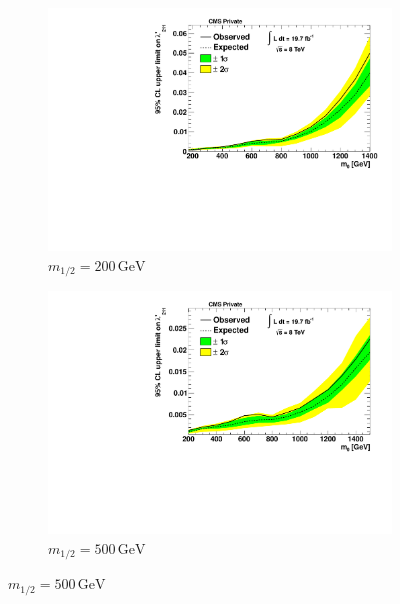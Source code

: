 \begin{figure}[!p]
  \centering
  \begin{subfigure}[b]{0.495\textwidth}
    \centering
    \includegraphics[width=\textwidth]{plots/limit_m12_200.pdf}
    \caption{$m_{1/2} = 200\,\text{GeV}$\label{fig:limit-m12-200}}
  \end{subfigure}
  \begin{subfigure}[b]{0.495\textwidth}
    \centering
    \includegraphics[width=\textwidth]{plots/limit_m12_500.pdf}
    \caption{$m_{1/2} = 500\,\text{GeV}$\label{fig:limit-m12-500}}
  \end{subfigure}


\end{figure}
